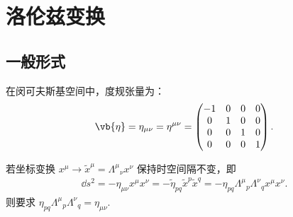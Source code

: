\chapter{洛伦兹变换}
\section{一般形式}
在闵可夫斯基空间中，度规张量为：
\begin{align*}
	\vb{\eta} = \eta_{\mu\nu} = \eta^{\mu\nu} = \begin{pmatrix}
		-1 & 0 & 0 & 0 \\
		0  & 1 & 0 & 0 \\
		0  & 0 & 1 & 0 \\
		0  & 0 & 0 & 1
	\end{pmatrix}.
\end{align*}

若坐标变换 \(x^\mu \to \tilde{x}^\mu = \Lambda^\mu{}_\nu x^\nu\) 保持时空间隔不变，即
\begin{align*}
	\dd s^2 = -\eta_{\mu\nu} x^\mu x^\nu = -\tilde{\eta}_{pq} \tilde{x}^p \tilde{x}^q = -\eta_{pq} \Lambda^\mu{}_p \Lambda^\nu{}_q x^\mu x^\nu.
\end{align*}
则要求 \(\eta_{pq} \Lambda^\mu{}_p \Lambda^\nu{}_q = \eta_{\mu\nu}\).

